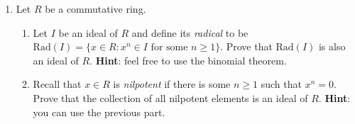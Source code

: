 \documentclass[11pt]{article}
\begin{document}
\begin{enumerate}
\item Let $R$ be a commutative ring.
\begin{enumerate}
\item Let $I$ be an ideal of $R$ and define its \emph{radical} to be $\mathrm{Rad}(I) = \{x \in R\colon x^n \in I \textrm{ for some $n \geq 1$}\}$. Prove that $\mathrm{Rad}(I)$ is also an ideal of $R$. {\bf Hint}: feel free to use the binomial theorem.
\item Recall that $x\in R$ is \emph{nilpotent} if there is some $n \geq 1$ such that $x^n=0$. Prove that the collection of all nilpotent elements is an ideal of $R$. {\bf Hint}: you can use the previous part.
\end{enumerate}



\end{enumerate}
\end{document}
